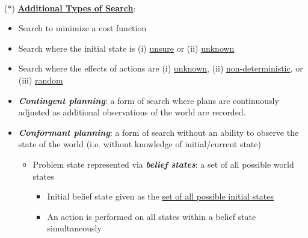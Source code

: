 \documentclass[12pt]{extarticle}
\theoremstyle{definition}
\theoremstyle{remark}
\newcommand{\pstart}[0]{\noindent}
\newcommand{\term}[1]{\noindent\textbf{\textit{#1}}}
\newcommand{\titleul}[1]{\noindent \textbf{\ul{#1}}}
\begin{document}
~\\ \pstart
($\ast$) \titleul{Additional Types of Search}: \begin{itemize}
    \item Search to minimize a cost function
    \item Search where the initial state is (i) \ul{unsure} or (ii) \ul{unknown}
    \item Search where the effects of actions are (i) \ul{unknown}, (ii) \ul{non-deterministic}, or (iii) \ul{random}
    \item \term{Contingent planning}: a form of search where plans are continuously adjusted as additional observations of the world are recorded.
    \item \term{Conformant planning}: a form of search without an ability to observe the state of the world (i.e. without knowledge of initial/current state) \begin{itemize}
        \item Problem state represented via \term{belief states}: a set of all possible world states \begin{itemize}
            \item Initial belief state given as the \ul{set of all possible initial states}
            \item An action is performed on all states within a belief state simultaneously
        \end{itemize}
    \end{itemize}
\end{itemize}
\end{document}
